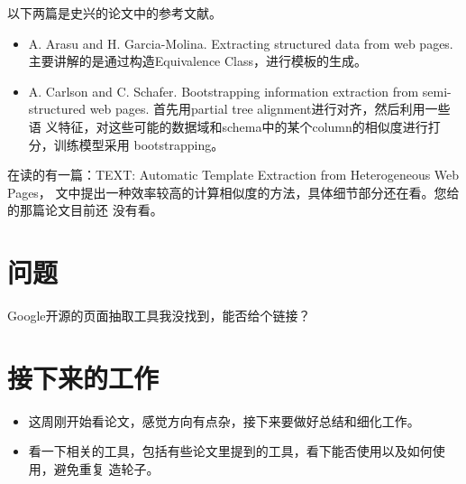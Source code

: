 \documentclass[a4paper]{article}
\begin{document}
以下两篇是史兴的论文中的参考文献。
\begin{itemize}
\item A. Arasu and H. Garcia-Molina. Extracting structured data from web pages.
  主要讲解的是通过构造Equivalence Class，进行模板的生成。
\item A. Carlson and C. Schafer. Bootstrapping information extraction from
  semi-structured web pages. 首先用partial tree alignment进行对齐，然后利用一些语
  义特征，对这些可能的数据域和schema中的某个column的相似度进行打分，训练模型采用
  bootstrapping。
\end{itemize}

在读的有一篇：TEXT: Automatic Template Extraction from Heterogeneous Web Pages，
文中提出一种效率较高的计算相似度的方法，具体细节部分还在看。您给的那篇论文目前还
没有看。
\section{问题}
\label{sec-2}

Google开源的页面抽取工具我没找到，能否给个链接？
\section{接下来的工作}
\label{sec-3}

\begin{itemize}
\item 这周刚开始看论文，感觉方向有点杂，接下来要做好总结和细化工作。
\item 看一下相关的工具，包括有些论文里提到的工具，看下能否使用以及如何使用，避免重复
  造轮子。
\end{itemize}
\end{document}
